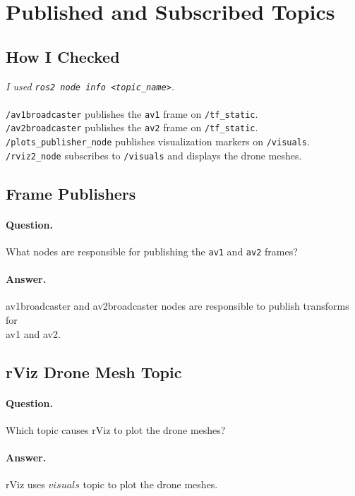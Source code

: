 \documentclass[11pt]{article}
\newcommand{\placeholder}[1]{\textit{#1}}
\newcommand{\cmd}[1]{\texttt{#1}}
\begin{document}
\section{Published and Subscribed Topics}

\subsection*{How I Checked}

\placeholder{I used \cmd{ros2 node info <topic\_name>}.} \\
\\
\cmd{/av1broadcaster} publishes the \cmd{av1} frame on
\cmd{/tf\_static}. \\
\cmd{/av2broadcaster} publishes the \cmd{av2} frame on \cmd{/tf\_static}. \\
\cmd{/plots\_publisher\_node} publishes visualization markers on \cmd{/visuals}. \\
\cmd{/rviz2\_node} subscribes to \cmd{/visuals} and displays the drone meshes. \\

\subsection*{Frame Publishers}

\paragraph{Question.}
What nodes are responsible for publishing the \cmd{av1} and \cmd{av2} frames?

\paragraph{Answer.}
av1broadcaster and av2broadcaster nodes are responsible to publish transforms for \\
av1 and av2. 
\subsection*{rViz Drone Mesh Topic}

\paragraph{Question.}
Which topic causes rViz to plot the drone meshes?

\paragraph{Answer.}
rViz uses $visuals$ topic to plot the drone meshes. 
\end{document}
